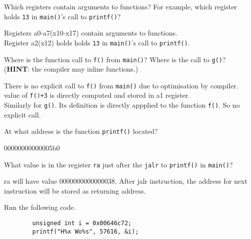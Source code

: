 \documentclass[11pt]{exam}
\begin{document}
\begin{questions}
    \question[3] Which registers contain arguments to functions? For example, which register holds \texttt{13} in \texttt{main()}'s call to \texttt{printf()}?
       
       \begin{solution}

		Registers a0-a7(x10-x17) contain arguments to functions.\\
		Register a2(x12) holds holds \texttt{13} in \texttt{main()}'s call to \texttt{printf()}.

       \end{solution}
    
    
    \question[2] Where is the function call to \texttt{f()} from \texttt{main()}? Where is the call to \texttt{g()}? (\textbf{HINT}: the compiler may inline functions.)
    
        \begin{solution}

		There is no explicit call to \texttt{f()} from \texttt{main()} due to optimisation by compiler. value of \texttt{f()+3} is directly computed and stored in a1 register.\\
		Similarly for \texttt{g()}. Its definition is directly appplied to the function \texttt{f()}. So no explicit call.

        \end{solution}
    
    \question[2] At what address is the function \texttt{printf()} located?
        \begin{solution}

		00000000000005b0

        \end{solution}
        
    
    \question[2] What value is in the register \texttt{ra} just after the \texttt{jalr} to \texttt{printf()} in \texttt{main()}?
    
        \begin{solution}

		ra will have value 0000000000000038. After jalr instruction, the address for next instruction will be stored as returning address.

        \end{solution}
        
    \question[11] Run the following code.
    \begin{verbatim}
        unsigned int i = 0x00646c72;
        printf("H%x Wo%s", 57616, &i);
    \end{verbatim}
	\begin{parts}

\end{parts}
\end{questions}
\end{document}
